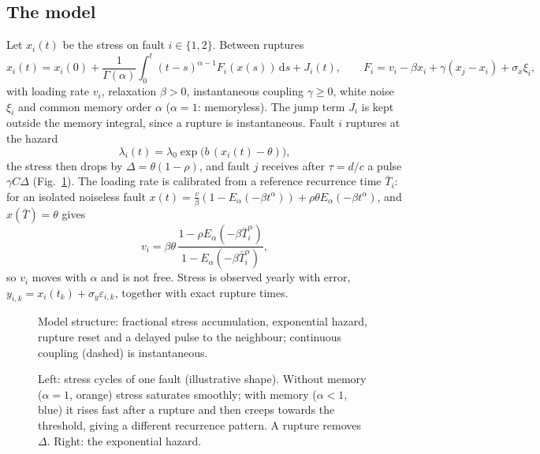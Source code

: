 \documentclass[10pt,a4paper]{article}
\newcommand{\dd}{\,\mathrm{d}}
\newcommand{\Tb}{\bar T}
\begin{document}
\subsection{The model}
Let $x_i(t)$ be the stress on fault $i\in\{1,2\}$. Between ruptures
\begin{equation}\label{eq:volterra}
x_i(t)=x_i(0)+\frac{1}{\Gamma(\alpha)}\int_0^t (t-s)^{\alpha-1}F_i(x(s))\dd s+J_i(t),\qquad F_i=v_i-\beta x_i+\gamma(x_j-x_i)+\sigma_x\xi_i ,
\end{equation}
with loading rate $v_i$, relaxation $\beta>0$, instantaneous coupling $\gamma\ge0$, white noise $\xi_i$ and common memory order $\alpha$ ($\alpha=1$: memoryless). The jump term $J_i$ is kept outside the memory integral, since a rupture is instantaneous. Fault $i$ ruptures at the hazard
\begin{equation}\label{eq:hazard}
\lambda_i(t)=\lambda_0\exp\!\big(b\,(x_i(t)-\theta)\big),
\end{equation}
the stress then drops by $\Delta=\theta(1-\rho)$, and fault $j$ receives after $\tau=d/c$ a pulse $\gamma C\Delta$ (Fig.~\ref{fig:schematic}). The loading rate is calibrated from a reference recurrence time $\Tb_i$: for an isolated noiseless fault $x(t)=\frac v\beta(1-E_\alpha(-\beta t^\alpha))+\rho\theta E_\alpha(-\beta t^\alpha)$, and $x(\Tb)=\theta$ gives
\begin{equation}\label{eq:loading}
v_i=\beta\theta\,\frac{1-\rho E_\alpha(-\beta\Tb_i^\alpha)}{1-E_\alpha(-\beta\Tb_i^\alpha)},
\end{equation}
so $v_i$ moves with $\alpha$ and is not free. Stress is observed yearly with error, $y_{i,k}=x_i(t_k)+\sigma_y\varepsilon_{i,k}$, together with exact rupture times.

\begin{figure}[t]
\centering\resizebox{0.86\textwidth}{!}{}
\caption{Model structure: fractional stress accumulation, exponential hazard, rupture reset and a delayed pulse to the neighbour; continuous coupling (dashed) is instantaneous.}\label{fig:schematic}
\end{figure}

\begin{figure}[t]
\centering\resizebox{\textwidth}{!}{\figCycle}
\caption{Left: stress cycles of one fault (illustrative shape). Without memory ($\alpha=1$, orange) stress saturates smoothly; with memory ($\alpha<1$, blue) it rises fast after a rupture and then creeps towards the threshold, giving a different recurrence pattern. A rupture removes $\Delta$. Right: the exponential hazard.}\label{fig:cycle}
\end{figure}
\end{document}
